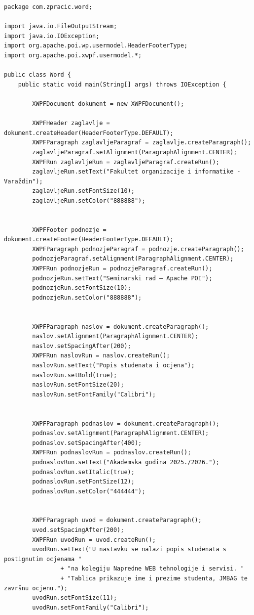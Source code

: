 \documentclass[]{foi}
\begin{document}
\begin{lstlisting}[style=Java, caption=Kreiranje word dokument]
package com.zpracic.word;

import java.io.FileOutputStream;
import java.io.IOException;
import org.apache.poi.wp.usermodel.HeaderFooterType;
import org.apache.poi.xwpf.usermodel.*;

public class Word {
    public static void main(String[] args) throws IOException {

        XWPFDocument dokument = new XWPFDocument();

        XWPFHeader zaglavlje = dokument.createHeader(HeaderFooterType.DEFAULT);
        XWPFParagraph zaglavljeParagraf = zaglavlje.createParagraph();
        zaglavljeParagraf.setAlignment(ParagraphAlignment.CENTER);
        XWPFRun zaglavljeRun = zaglavljeParagraf.createRun();
        zaglavljeRun.setText("Fakultet organizacije i informatike - Varaždin");
        zaglavljeRun.setFontSize(10);
        zaglavljeRun.setColor("888888");
        

        XWPFFooter podnozje = dokument.createFooter(HeaderFooterType.DEFAULT);
        XWPFParagraph podnozjeParagraf = podnozje.createParagraph();
        podnozjeParagraf.setAlignment(ParagraphAlignment.CENTER);
        XWPFRun podnozjeRun = podnozjeParagraf.createRun();
        podnozjeRun.setText("Seminarski rad — Apache POI");
        podnozjeRun.setFontSize(10);
        podnozjeRun.setColor("888888");
        

        XWPFParagraph naslov = dokument.createParagraph();
        naslov.setAlignment(ParagraphAlignment.CENTER);
        naslov.setSpacingAfter(200);
        XWPFRun naslovRun = naslov.createRun();
        naslovRun.setText("Popis studenata i ocjena");
        naslovRun.setBold(true);
        naslovRun.setFontSize(20);
        naslovRun.setFontFamily("Calibri");


        XWPFParagraph podnaslov = dokument.createParagraph();
        podnaslov.setAlignment(ParagraphAlignment.CENTER);
        podnaslov.setSpacingAfter(400);
        XWPFRun podnaslovRun = podnaslov.createRun();
        podnaslovRun.setText("Akademska godina 2025./2026.");
        podnaslovRun.setItalic(true);
        podnaslovRun.setFontSize(12);
        podnaslovRun.setColor("444444");
        

        XWPFParagraph uvod = dokument.createParagraph();
        uvod.setSpacingAfter(200);
        XWPFRun uvodRun = uvod.createRun();
        uvodRun.setText("U nastavku se nalazi popis studenata s postignutim ocjenama "
                + "na kolegiju Napredne WEB tehnologije i servisi. "
                + "Tablica prikazuje ime i prezime studenta, JMBAG te završnu ocjenu.");
        uvodRun.setFontSize(11);
        uvodRun.setFontFamily("Calibri");


\end{lstlisting}
\end{document}
